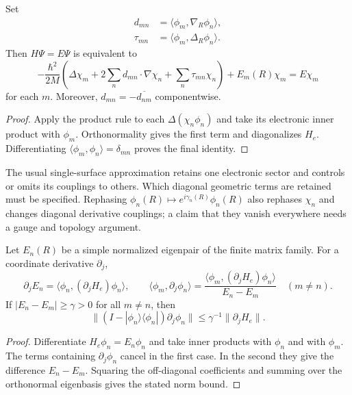 \begin{proposition}
\label{prop:micro-bornhuang}
Set
\[
 \begin{aligned}
 d_{mn}&=\langle\phi_m,\nabla_R\phi_n\rangle,\\
 \tau_{mn}&=\langle\phi_m,\Delta_R\phi_n\rangle.
 \end{aligned}
\]
Then $H\Psi=E\Psi$ is equivalent to
\begin{equation}
 -\frac{\hbar^2}{2M}
  \left(\Delta\chi_m+
        2\sum_n d_{mn}\cdot\nabla\chi_n+
        \sum_n\tau_{mn}\chi_n\right)
  +E_m(R)\chi_m=E\chi_m
 \label{eq:micro-bornhuang}
\end{equation}
for each $m$.  Moreover, $d_{mn}=-\overline{d_{nm}}$ componentwise.
\end{proposition}
\begin{proof}
Apply the product rule to each
$\Delta(\chi_n\phi_n)$ and take its electronic inner product with
$\phi_m$.  Orthonormality gives the first term and diagonalizes
$H_e$.  Differentiating
$\langle\phi_m,\phi_n\rangle=\delta_{mn}$ proves the final identity.
\end{proof}

The usual single-surface approximation retains one electronic sector and
controls or omits its couplings to others.  Which diagonal geometric
terms are retained must be specified.  Rephasing
$\phi_n(R)\mapsto e^{i\gamma_n(R)}\phi_n(R)$ also rephases
$\chi_n$ and changes diagonal derivative couplings; a claim that they
vanish everywhere needs a gauge and topology argument.

\begin{proposition}
\label{prop:micro-hellmann}
Let $E_n(R)$ be a simple normalized eigenpair of the finite matrix family.
For a coordinate derivative $\partial_j$,
\[
 \partial_j E_n
 =\langle\phi_n,(\partial_jH_e)\phi_n\rangle,
 \qquad
 \langle\phi_m,\partial_j\phi_n\rangle
 =\frac{\langle\phi_m,(\partial_jH_e)\phi_n\rangle}
        {E_n-E_m}\quad(m\ne n).
\]
If $|E_n-E_m|\ge\gamma>0$ for all $m\ne n$, then
\[
 \|(I-|\phi_n\rangle\langle\phi_n|)\partial_j\phi_n\|
 \le \gamma^{-1}\|\partial_jH_e\|.
\]
\end{proposition}
\begin{proof}
Differentiate $H_e\phi_n=E_n\phi_n$ and take inner products
with $\phi_n$ and with $\phi_m$.  The terms containing
$\partial_j\phi_n$ cancel in the first case.  In the second they
give the difference $E_n-E_m$.  Squaring the off-diagonal coefficients
and summing over the orthonormal eigenbasis gives the stated norm bound.
\end{proof}


